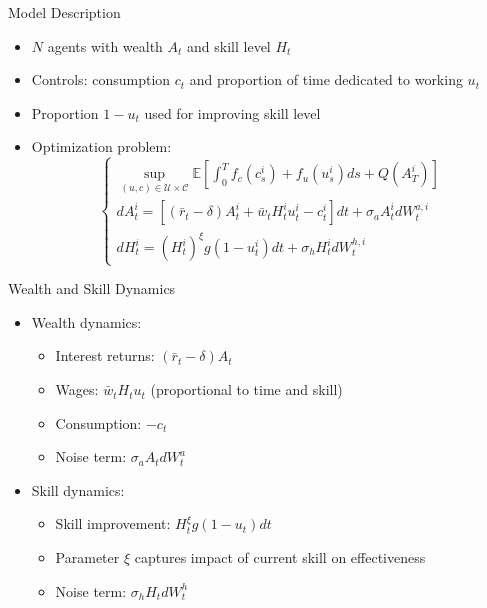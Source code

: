 \documentclass[xcolor=dvipsnames,t,aspectratio=170]{beamer} %
\begin{document}
\begin{frame}{Model Description}
\begin{itemize}
    \item $N$ agents with wealth $A_t$ and skill level $H_t$
    \item Controls: consumption $c_t$ and proportion of time dedicated to working $u_t$
    \item Proportion $1-u_t$ used for improving skill level
    \item Optimization problem:
    \begin{equation}
    \begin{cases}
        \sup\limits_{(u,c) \in \mathcal{U} \times \mathcal{C}}\mathbb{E} [ \int_0^T f_c(c^i_s) + f_u(u^i_s) ds + Q(A^i_T) ]\\
        d A^i_t = \left[ (\bar r_t - \delta) A^i_t + \bar w_t H^i_t u^i_t - c^i_t  \right] dt + \sigma_a A^i_t d W^{a,i}_t\\
        d H^i_t = (H^i_t)^\xi g(1 - u^i_t) dt + \sigma_h H^i_t d W^{h,i}_t
    \end{cases}
    \end{equation}
\end{itemize}
\end{frame}

\begin{frame}{Wealth and Skill Dynamics}
\begin{itemize}
    \item Wealth dynamics:
    \begin{itemize}
        \item Interest returns: $(\bar r_t - \delta) A_t$
        \item Wages: $\bar w_t H_t u_t$ (proportional to time and skill)
        \item Consumption: $-c_t$
        \item Noise term: $\sigma_a A_t d W^a_t$
    \end{itemize}
    \item Skill dynamics:
    \begin{itemize}
        \item Skill improvement: $H^\xi_t g(1 - u_t) dt$
        \item Parameter $\xi$ captures impact of current skill on effectiveness
        \item Noise term: $\sigma_h H_t dW^h_t$
    \end{itemize}
\end{itemize}
\end{frame}
\end{document}
